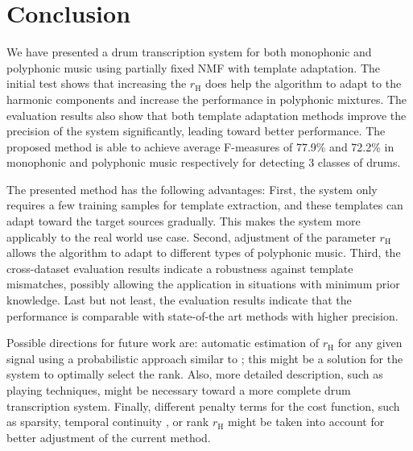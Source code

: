 \documentclass{article}
\begin{document}
\section{Conclusion}\label{sec:Conclusion}
We have presented a drum transcription system for both monophonic and polyphonic music using partially fixed NMF with template adaptation. The initial test shows that increasing the $r_\mathrm{H}$ does help the algorithm to adapt to the harmonic components and increase the performance in polyphonic mixtures. The evaluation results also show that both template adaptation methods improve the precision of the system significantly, leading toward better performance. The proposed method is able to achieve average F-measures of 77.9\% and 72.2\% in monophonic and polyphonic music respectively for detecting 3 classes of drums. 

The presented method has the following advantages: 
First, the system only requires a few training samples for template extraction, and these templates can adapt toward the target sources gradually. This makes the system more applicably to the real world use case. 
Second, adjustment of the parameter $r_\mathrm{H}$ allows the algorithm to adapt to different types of polyphonic music. 
Third, the cross-dataset evaluation results indicate a robustness against template mismatches, possibly allowing the application in situations with minimum prior knowledge. 
Last but not least, the evaluation results indicate that the performance is comparable with state-of-the art methods with higher precision. 

Possible directions for future work are:
automatic estimation of $r_\mathrm{H}$ for any given signal using a probabilistic approach similar to  \cite{ouo_inmf_2010}; this might be a solution for the system to optimally select the rank. Also, more detailed description, such as playing techniques, might be necessary toward a more complete drum transcription system. Finally, different penalty terms for the cost function, such as sparsity, temporal continuity \cite{virtanen_ssnmf_2007}, or rank $r_\mathrm{H}$ might be taken into account for better adjustment of the current method.   


\end{document}
